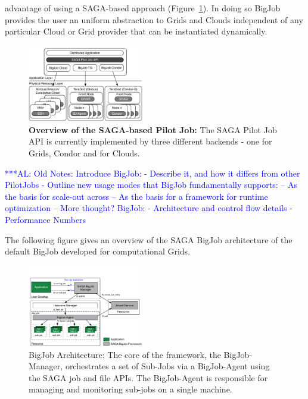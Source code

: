 \documentclass[conference,final]{IEEEtran}
\newcommand{\alnote}[1]{ {\textcolor{blue} { ***AL: #1 }}}
\newcommand{\alnote}[1]{}
\begin{document}
advantage of using a SAGA-based approach (Figure~\ref{fig:figures_distributed_pilot_job}).
In doing so BigJob provides the user an uniform abstraction to Grids and Clouds
independent of any particular Cloud or Grid provider that can be
instantiated dynamically.
\begin{figure}[htbp]
    \centering
        \includegraphics[width=0.45\textwidth]{figures/distributed_pilot_job.pdf}
    \caption{\textbf{Overview of the SAGA-based Pilot Job:} The SAGA Pilot Job API is
    currently implemented by three different backends - one for Grids, Condor and 
    for Clouds.}
    \label{fig:figures_distributed_pilot_job}
\end{figure}

\alnote{Old Notes: 
Introduce BigJob:
 - Describe it, and how it differs from other PilotJobs
 - Outline new usage modes that BigJob fundamentally supports:
    -- As the basis for scale-out across
    -- As the basis for a framework for runtime optimization
    -- More thought?
BigJob:
 - Architecture and control flow details
 - Performance Numbers}


The following figure gives an overview of the SAGA BigJob architecture of the default BigJob
developed for computational Grids.

\begin{figure}[htbp]
    \centering
    \includegraphics[width=0.45\textwidth]{figures/bigjob}
   \caption{BigJob Architecture: The core of the framework, the
      BigJob-Manager, orchestrates a set of Sub-Jobs via a
      BigJob-Agent using the SAGA job and file APIs.  The
      BigJob-Agent is responsible for managing and monitoring sub-jobs
      on a single machine.}
   \label{fig:figures_bigjob}
\end{figure}
\end{document}
